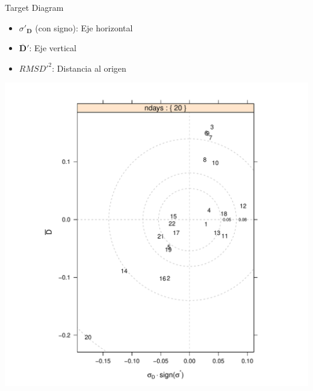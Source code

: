 \documentclass[xcolor={usenames,svgnames,dvipsnames}]{beamer}
\begin{document}
\begin{frame}[label={sec:orga1f71fd}]{Target Diagram}
\begin{itemize}
\item \(\sigma'_{\mathbf{D}}\) (con signo): Eje horizontal
\item \(\overline{\mathbf{D}}'\): Eje vertical
\item \(RMSD'^2\): Distancia al origen
\end{itemize}

\begin{center}
\begin{center}
\includegraphics[height=0.7\textheight]{../figs/TargetDiagram.pdf}
\end{center}
\end{center}
\end{frame}
\end{document}
